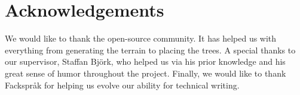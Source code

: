 \chapter*{Acknowledgements}
We would like to thank the open-source community. 
It has helped us with everything from generating the terrain to placing the trees.
A special thanks to our supervisor, Staffan Björk, who helped us via his prior knowledge and his great sense of humor throughout the project.
Finally, we would like to thank Fackspråk for helping us evolve our ability for technical writing.
